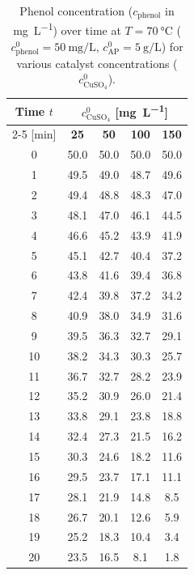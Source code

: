 \begin{table}[htbp]
    \centering
    \caption{Phenol concentration ($c_{\text{phenol}}$ in \si{\milli\gram\per\liter}) over time at $T = \SI{70}{\degreeCelsius}$ ($c^0_{\text{phenol}} = \SI{50}{\milli\gram\per\liter}$, $c^0_{\text{AP}} = \SI{5}{\gram\per\liter}$) for various catalyst concentrations ($c^0_{\mathrm{CuSO_4}}$).}
    \label{tab:task1_catalyst}
    \begin{tabular}{ccccc}
        \toprule
        \textbf{Time} $t$ & \multicolumn{4}{c}{$c^0_{\mathrm{CuSO_4}}$ [\si{\milli\gram\per\liter}]} \\
        \cmidrule{2-5}
        {[\si{\minute}]} & \textbf{25} & \textbf{50} & \textbf{100} & \textbf{150} \\
        \midrule
        0  & 50.0 & 50.0 & 50.0 & 50.0 \\
        1  & 49.5 & 49.0 & 48.7 & 49.6 \\
        2  & 49.4 & 48.8 & 48.3 & 47.0 \\
        3  & 48.1 & 47.0 & 46.1 & 44.5 \\
        4  & 46.6 & 45.2 & 43.9 & 41.9 \\
        5  & 45.1 & 42.7 & 40.4 & 37.2 \\
        6  & 43.8 & 41.6 & 39.4 & 36.8 \\
        7  & 42.4 & 39.8 & 37.2 & 34.2 \\
        8  & 40.9 & 38.0 & 34.9 & 31.6 \\
        9  & 39.5 & 36.3 & 32.7 & 29.1 \\
        10 & 38.2 & 34.3 & 30.3 & 25.7 \\
        11 & 36.7 & 32.7 & 28.2 & 23.9 \\
        12 & 35.2 & 30.9 & 26.0 & 21.4 \\
        13 & 33.8 & 29.1 & 23.8 & 18.8 \\
        14 & 32.4 & 27.3 & 21.5 & 16.2 \\
        15 & 30.3 & 24.6 & 18.2 & 11.6 \\
        16 & 29.5 & 23.7 & 17.1 & 11.1 \\
        17 & 28.1 & 21.9 & 14.8 & 8.5 \\
        18 & 26.7 & 20.1 & 12.6 & 5.9 \\
        19 & 25.2 & 18.3 & 10.4 & 3.4 \\
        20 & 23.5 & 16.5 & 8.1  & 1.8 \\
        \bottomrule
    \end{tabular}
\end{table}


